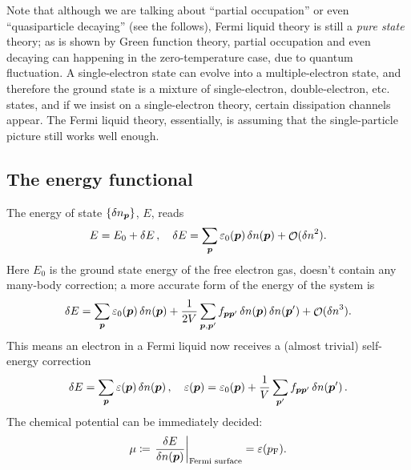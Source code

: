 \documentclass[hyperref, a4paper]{article}
\DeclareMathOperator{\bigO}{\mathcal{O}}
\newcommand*{\pfermi}{p_{\text{F}}}
\begin{document}
Note that although we are talking about ``partial occupation''
or even ``quasiparticle decaying'' (see the follows), 
Fermi liquid theory is still a \emph{pure state} theory; 
as is shown by Green function theory, 
partial occupation and even decaying can happening 
in the zero-temperature case, 
due to quantum fluctuation.
A single-electron state can evolve into a multiple-electron state, 
and therefore the ground state is a mixture of single-electron, double-electron, etc. states, 
and if we insist on a single-electron theory,
certain dissipation channels appear.
The Fermi liquid theory, essentially, 
is assuming that the single-particle picture still works well enough.

\subsection{The energy functional}

The energy of state $\{\var{n}_{\vb*{p}}\}$, $E$, reads 
\begin{equation}
    E = E_0 + \var{E}, \quad 
    \var{E}  = \sum_{\vb*{p}} \varepsilon_0(\vb*{p}) \var{n(\vb*{p})} + 
    \bigO(\var{n}^2).
    \label{eq:fermi-liquid.linear-energy}
\end{equation}
Here $E_0$ is the ground state energy of the free electron gas, 
 doesn't contain any many-body correction; 
a more accurate form of the energy of the system is 
\begin{equation}
    \var{E} = \sum_{\vb*{p}} \varepsilon_0(\vb*{p}) \var{n(\vb*{p})}
    + \frac{1}{2 V} \sum_{\vb*{p}, \vb*{p}'}
    f_{\vb*{p} \vb*{p}'} \var{n(\vb*{p})} \var{n(\vb*{p}')} + \bigO(\var{n}^3).
\end{equation}
This means an electron in a Fermi liquid now receives a (almost trivial) self-energy correction 
\begin{equation}
    \var{E} = \sum_{\vb*{p}} \varepsilon(\vb*{p}) \var{n(\vb*{p})} , 
    \quad \varepsilon(\vb*{p}) = \varepsilon_0(\vb*{p}) 
    + \frac{1}{V} \sum_{\vb*{p}'} f_{\vb*{p} \vb*{p}'} \var{n(\vb*{p}')}.
    \label{eq:fermi-liquid.quasiparticle-energy}
\end{equation}
The chemical potential can be immediately decided:
\begin{equation}
    \mu \coloneqq \eval{\fdv{E}{n(\vb*{p})}}_{\text{Fermi surface}} = \varepsilon(\pfermi).
\end{equation}
\end{document}
